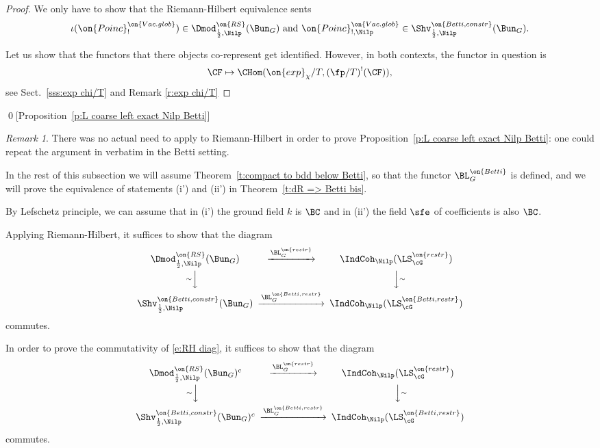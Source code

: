 \documentclass[9pt]{amsart}
\theoremstyle{remark}
\newtheorem{rem}[subsubsection]{Remark}
\theoremstyle{definition}
\theoremstyle{remark}
\newcommand{\thmref}[1]{Theorem~\ref{#1}}
\newcommand{\secref}[1]{Sect.~\ref{#1}}
\newcommand{\propref}[1]{Proposition~\ref{#1}}
\numberwithin{equation}{section}
\begin{document}
\begin{proof}

We only have to show that the Riemann-Hilbert equivalence sents
$$\iota(\on{Poinc}_!^{\on{Vac.glob}})\in \Dmod^{\on{RS}}_{\frac{1}{2},\Nilp}(\Bun_G) 
\text{ and } \on{Poinc}_{!,\Nilp}^{\on{Vac.glob}}\in \Shv^{\on{Betti,constr}}_{\frac{1}{2},\Nilp}(\Bun_G).$$

Let us show that the functors that there objects co-represent get identified. However, in both contexts,
the functor in question is 
$$\CF\mapsto \CHom(\on{exp}_\chi/T,(\fp/T)^!(\CF)),$$
see \secref{sss:exp chi/T} and Remark \ref{r:exp chi/T}
 
\end{proof} 

\qed[\propref{p:L coarse left exact Nilp Betti}]

\begin{rem}
There was no actual need to apply to Riemann-Hilbert in order to prove \propref{p:L coarse left exact Nilp Betti}:
one could repeat the argument in \cite{FR} verbatim in the Betti setting.
\end{rem} 

\sssec{} \label{sss:Betti vs dR restr}

In the rest of this subsection we will assume \thmref{t:compact to bdd below Betti}, so that the functor
$\BL_G^{\on{Betti}}$ is defined, and we will prove the equivalence of statements
(i') and (ii') in \thmref{t:dR => Betti bis}. 

\medskip 

By Lefschetz principle, we can 
assume that in (i') the ground field $k$ is $\BC$ and in (ii') the field $\sfe$ of coefficients is also
$\BC$.

\medskip

Applying Riemann-Hilbert, it suffices to show that the diagram 
\begin{equation} \label{e:RH diag}
\CD
\Dmod^{\on{RS}}_{\frac{1}{2},\Nilp}(\Bun_G)  @>{\BL_G^{\on{restr}}}>>  \IndCoh_\Nilp(\LS^{\on{restr}}_\cG) \\
@V{\sim}VV @VV{\sim}V \\
\Shv^{\on{Betti,constr}}_{\frac{1}{2},\Nilp}(\Bun_G) @>{\BL_G^{\on{Betti,restr}}}>> \IndCoh_\Nilp(\LS^{\on{Betti,restr}}_\cG)
\endCD
\end{equation}
commutes. 

\medskip

In order to prove the commutativity of \eqref{e:RH diag}, it suffices to show that the diagram
\begin{equation} \label{e:RH diag comp}
\CD
\Dmod^{\on{RS}}_{\frac{1}{2},\Nilp}(\Bun_G)^c  @>{\BL_G^{\on{restr}}}>>  \IndCoh_\Nilp(\LS^{\on{restr}}_\cG) \\
@V{\sim}VV @VV{\sim}V \\
\Shv^{\on{Betti,constr}}_{\frac{1}{2},\Nilp}(\Bun_G)^c @>{\BL_G^{\on{Betti,restr}}}>> \IndCoh_\Nilp(\LS^{\on{Betti,restr}}_\cG)
\endCD
\end{equation}
commutes. 
\end{document}
